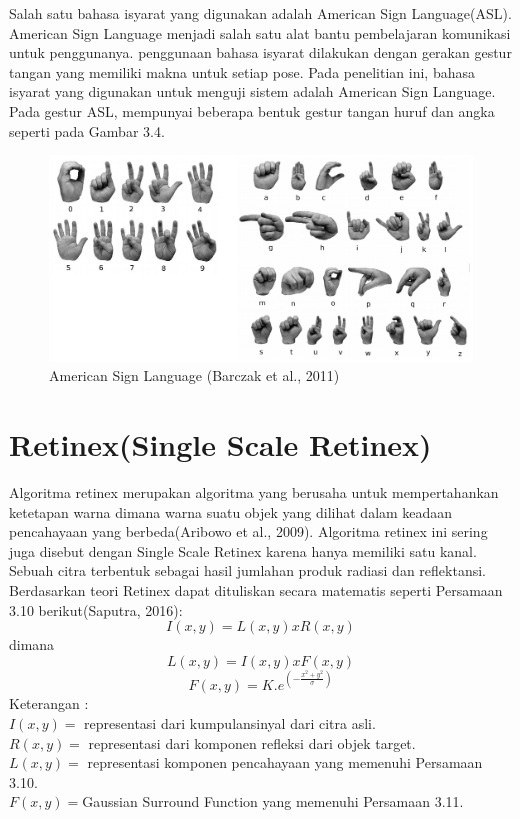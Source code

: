 Salah satu bahasa isyarat yang digunakan adalah American Sign Language(ASL). American Sign Language menjadi salah satu alat bantu pembelajaran komunikasi untuk penggunanya. penggunaan bahasa isyarat dilakukan dengan gerakan gestur tangan yang memiliki makna untuk setiap pose. Pada penelitian ini, bahasa isyarat yang digunakan untuk menguji sistem adalah American Sign Language. Pada gestur ASL, mempunyai beberapa bentuk gestur tangan huruf dan angka seperti pada Gambar 3.4.
\begin{figure}[H]
	\centering
	\includegraphics[width=0.7\linewidth]{"asl"}
	\caption{American Sign Language (Barczak et al., 2011)}
	\label{fig:asl}
\end{figure}
\section{Retinex(Single Scale Retinex)}
Algoritma retinex merupakan algoritma yang berusaha untuk mempertahankan ketetapan warna dimana warna suatu objek yang dilihat dalam keadaan pencahayaan yang berbeda(Aribowo et al., 2009). Algoritma retinex ini sering juga disebut dengan Single Scale Retinex karena hanya memiliki satu kanal. Sebuah citra terbentuk sebagai hasil jumlahan produk radiasi dan reflektansi. Berdasarkan teori Retinex dapat dituliskan secara matematis seperti Persamaan 3.10 berikut(Saputra, 2016):
\begin{equation}
	I(x,y) = L(x,y) x R(x,y)
\end{equation}
dimana 
\begin{equation}
	L(x,y) = I(x,y) x F(x,y)
\end{equation}
\begin{equation}
F(x,y) = K.e^{(-\frac{x^2 + y^2}{\sigma})}
\end{equation}
Keterangan :\\
\(I(x,y) =\) representasi dari kumpulansinyal dari citra asli.\\
\(R(x,y) =\) representasi dari komponen refleksi dari objek target.\\
\(L(x,y) =\) representasi komponen pencahayaan yang memenuhi Persamaan 3.10.\\
\(F(x,y) =\)Gaussian Surround Function yang memenuhi Persamaan 3.11.

